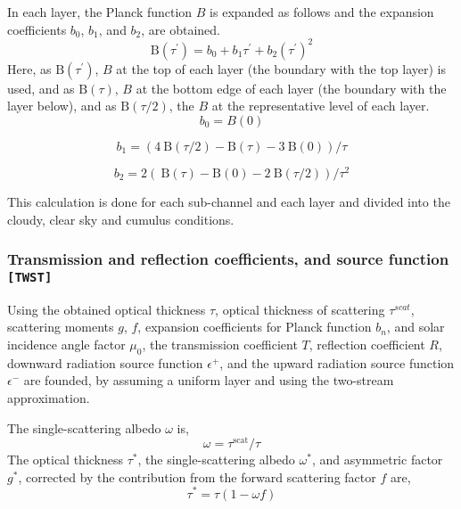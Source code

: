 In each layer, the Planck function \(B\) is expanded as follows and the
expansion coefficients \(b_0\), \(b_1\), and \(b_2\), are obtained. \begin{equation}
\mathrm{B}\left(\tau^{\prime}\right)=b_{0}+b_{1} \tau^{\prime}+b_{2}\left(\tau^{\prime}\right)^{2}
\end{equation} Here, as \(\mathrm{B}\left(\tau^{\prime}\right)\), \(B\) at the top
of each layer (the boundary with the top layer) is used, and as
\(\mathrm{B}(\tau)\), \(B\) at the bottom edge of each layer (the
boundary with the layer below), and as \(\mathrm{B}(\tau / 2)\), the
\(B\) at the representative level of each layer. \begin{equation}
b_{0}=B(0)
\end{equation}

\begin{equation}
b_{1}=(4 \mathrm{~B}(\tau / 2)-\mathrm{B}(\tau)-3 \mathrm{~B}(0)) / \tau
\end{equation}

\begin{equation}
b_{2}=2(\mathrm{~B}(\tau)-\mathrm{B}(0)-2 \mathrm{~B}(\tau / 2)) / \tau^{2}
\end{equation}

This calculation is done for each sub-channel and each layer and divided
into the cloudy, clear sky and cumulus conditions.

\hypertarget{transmission-and-reflection-coefficients-and-source-function-twst}{%
\subsubsection{\texorpdfstring{Transmission and reflection coefficients,
and source function
\texttt{{[}TWST{]}}}{Transmission and reflection coefficients, and source function {[}TWST{]}}}\label{transmission-and-reflection-coefficients-and-source-function-twst}}

Using the obtained optical thickness \(\tau\), optical thickness of
scattering \(\tau^{scat}\), scattering moments \(g\), \(f\), expansion
coefficients for Planck function \(b_n\), and solar incidence angle
factor \(\mu_{0}\), the transmission coefficient \(T\), reflection
coefficient \(R\), downward radiation source function \(\epsilon^{+}\),
and the upward radiation source function \(\epsilon^{-}\) are founded,
by assuming a uniform layer and using the two-stream approximation.

The single-scattering albedo \(\omega\) is, \begin{equation}
\omega=\tau^{\text{scat}}/\tau
\end{equation} The optical thickness \(\tau^{*}\), the single-scattering albedo
\(\omega^{*}\), and asymmetric factor \(g^{*}\), corrected by the
contribution from the forward scattering factor \(f\) are, \begin{equation}
\tau^{*}=\tau(1-\omega f)
\end{equation}

